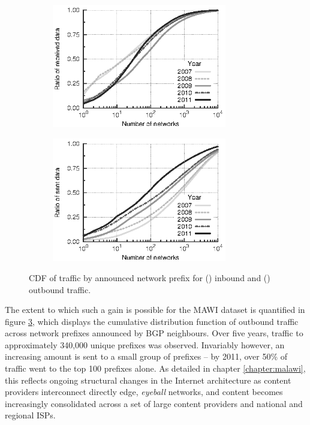 \begin{figure}[t]
    \begin{subfigure}[b]{0.5\linewidth}
        \centering
        \includegraphics[width=3.0in]{figures/inflex/ecdf_network_dst_data_bytes_from_10000.eps}
        \caption{\label{prefix_in}}
    \end{subfigure}
    \begin{subfigure}[b]{0.5\linewidth}
        \centering
        \includegraphics[width=3.0in]{figures/inflex/ecdf_network_dst_data_bytes_to_10000.eps}
        \caption{\label{prefix_out}}
    \end{subfigure}%
    \caption[\acs{CDF} of traffic by announced network prefix.]{\acs{CDF} of traffic by announced network prefix for () inbound and () outbound traffic.\label{fig:prefix}}
    \hfill
\end{figure}

The extent to which such a gain is possible for the \ac{MAWI} dataset is quantified in figure \ref{fig:prefix}, which displays the cumulative distribution function of outbound traffic across network prefixes announced by \ac{BGP} neighbours.
Over five years, traffic to approximately 340,000 unique prefixes was observed.
Invariably however, an increasing amount is sent to a small group of prefixes -- by 2011, over 50\% of traffic went to the top 100 prefixes alone.
As detailed in chapter \ref{chapter:malawi}, this reflects ongoing structural changes in the Internet architecture as content providers interconnect directly edge, \emph{eyeball} networks, and content becomes increasingly consolidated across a set of large content providers and national and regional ISPs.

